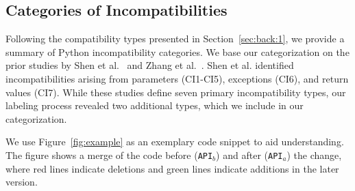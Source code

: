 \subsection{Categories of Incompatibilities}

Following the compatibility types presented in Section~\ref{sec:back:1}, we provide a summary of Python incompatibility categories. We base our categorization on the prior studies by Shen et al.~\cite{shen2024static} and Zhang et al.~\cite{zhang2020python}. Shen et al. identified incompatibilities arising from parameters (CI1-CI5), exceptions (CI6), and return values (CI7). While these studies define seven primary incompatibility types, our labeling process revealed two additional types, which we include in our categorization.

We use Figure~\ref{fig:example} as an exemplary code snippet to aid understanding. The figure shows a merge of the code before (\texttt{API}$_b$) and after (\texttt{API}$_a$) the change, where red lines indicate deletions and green lines indicate additions in the later version.


